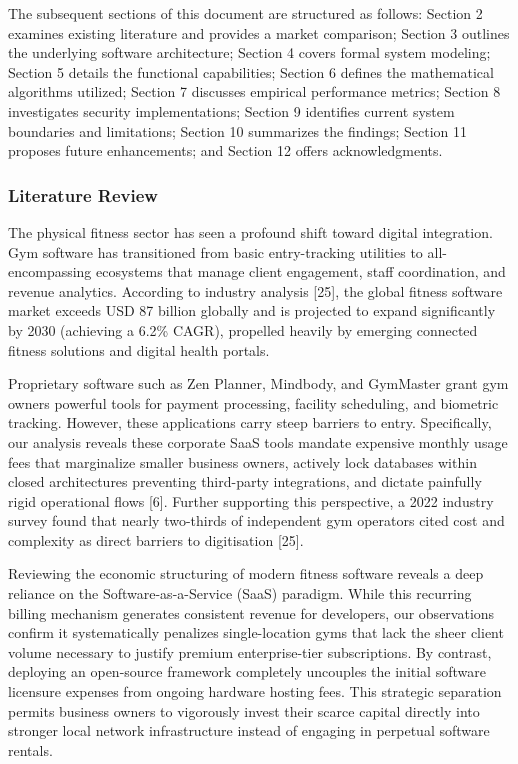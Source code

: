 The subsequent sections of this document are structured as follows:
Section 2 examines existing literature and provides a market comparison;
Section 3 outlines the underlying software architecture; Section 4
covers formal system modeling; Section 5 details the functional
capabilities; Section 6 defines the mathematical algorithms utilized;
Section 7 discusses empirical performance metrics; Section 8
investigates security implementations; Section 9 identifies current
system boundaries and limitations; Section 10 summarizes the findings;
Section 11 proposes future enhancements; and Section 12 offers
acknowledgments.

\subsubsection*{Literature Review}\label{literature-review}

The physical fitness sector has seen a profound shift toward digital
integration. Gym software has transitioned from basic entry-tracking
utilities to all-encompassing ecosystems that manage client engagement,
staff coordination, and revenue analytics. According to industry
analysis {[}25{]}, the global fitness software market exceeds USD 87
billion globally and is projected to expand significantly by 2030
(achieving a 6.2\% CAGR), propelled heavily by emerging connected
fitness solutions and digital health portals.

Proprietary software such as Zen Planner, Mindbody, and GymMaster grant
gym owners powerful tools for payment processing, facility scheduling,
and biometric tracking. However, these applications carry steep barriers
to entry. Specifically, our analysis reveals these corporate SaaS tools
mandate expensive monthly usage fees that marginalize smaller business
owners, actively lock databases within closed architectures preventing
third-party integrations, and dictate painfully rigid operational flows
{[}6{]}. Further supporting this perspective, a 2022 industry survey
found that nearly two-thirds of independent gym operators cited cost and
complexity as direct barriers to digitisation {[}25{]}.

Reviewing the economic structuring of modern fitness software reveals a
deep reliance on the Software-as-a-Service (SaaS) paradigm. While this
recurring billing mechanism generates consistent revenue for developers,
our observations confirm it systematically penalizes single-location
gyms that lack the sheer client volume necessary to justify premium
enterprise-tier subscriptions. By contrast, deploying an open-source
framework completely uncouples the initial software licensure expenses
from ongoing hardware hosting fees. This strategic separation permits
business owners to vigorously invest their scarce capital directly into
stronger local network infrastructure instead of engaging in perpetual
software rentals.

